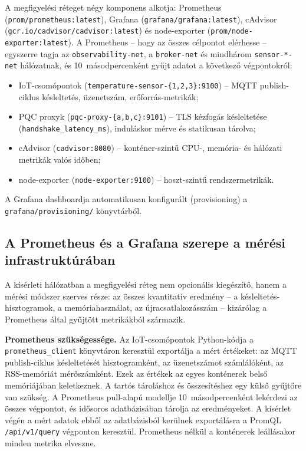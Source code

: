 A megfigyelési réteget négy komponens alkotja: Prometheus (\texttt{prom/prometheus:latest}),
Grafana (\texttt{grafana/grafana:latest}), cAdvisor (\texttt{gcr.io/cadvisor/cadvisor:latest}) és
node-exporter (\texttt{prom/node-exporter:latest}). A Prometheus -- hogy az összes célpontot
elérhesse -- egyszerre tagja az \texttt{observability-net}, a \texttt{broker-net} és mindhárom
\texttt{sensor-*-net} hálózatnak, és 10~másodpercenként gyűjt adatot a következő végpontokról:
\begin{itemize}
    \item IoT-csomópontok (\texttt{temperature-sensor-\{1,2,3\}:9100}) -- MQTT publish-ciklus
          késleltetés, üzenetszám, erőforrás-metrikák;
    \item PQC proxyk (\texttt{pqc-proxy-\{a,b,c\}:9101}) -- TLS kézfogás késleltetése
          (\texttt{handshake\_latency\_ms}), induláskor mérve és statikusan tárolva;
    \item cAdvisor (\texttt{cadvisor:8080}) -- konténer-szintű CPU-, memória- és
          hálózati metrikák valós időben;
    \item node-exporter (\texttt{node-exporter:9100}) -- hoszt-szintű rendszermetrikák.
\end{itemize}
A Grafana dashboardja automatikusan konfigurált (provisioning) a
\texttt{grafana/provisioning/} könyvtárból.

\subsection{A Prometheus és a Grafana szerepe a mérési infrastruktúrában}

A kísérleti hálózatban a megfigyelési réteg nem opcionális kiegészítő, hanem a
mérési módszer szerves része: az összes kvantitatív eredmény -- a késleltetés-hisztogramok,
a memóriahasználat, az újracsatlakozásszám -- kizárólag a Prometheus által gyűjtött
metrikákból származik.

\textbf{Prometheus szükségessége.}
Az IoT-csomópontok Python-kódja a \texttt{prometheus\_client} könyvtáron keresztül
exportálja a mért értékeket: az MQTT publish-ciklus késleltetését hisztogramként, az
üzenetszámot számlálóként, az RSS-memóriát mérőszámként. Ezek az értékek az egyes
konténerek belső memóriájában keletkeznek. A tartós tároláshoz és összesítéshez egy
külső gyűjtőre van szükség. A Prometheus pull-alapú modellje 10~másodpercenként
lekérdezi az összes végpontot, és idősoros adatbázisában tárolja az eredményeket.
A kísérlet végén a mért adatok ebből az adatbázisból kerülnek exportálásra a
PromQL \texttt{/api/v1/query} végponton keresztül. Prometheus nélkül a konténerek
leállásakor minden metrika elveszne.


